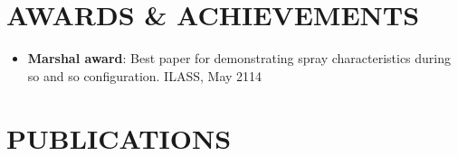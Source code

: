 \documentclass{res}
\begin{document}
\begin{resume}
	\section{\MakeUppercase{Awards \& Achievements}} \vskip 0.35in
	\begin{itemize}[leftmargin=\parindent]
	\setlength{\itemsep}{0mm}
	
		\item[] {\bf Marshal award}:  Best paper for demonstrating spray characteristics during so and so configuration. ILASS, May 2114
	\end{itemize}
	
	
	
	\section{\MakeUppercase{Publications}} \vskip 0.35in
	\begin{itemize}[leftmargin=\parindent]
	\setlength{\itemsep}{4pt}
	

\end{itemize}
\end{resume}
\end{document}
